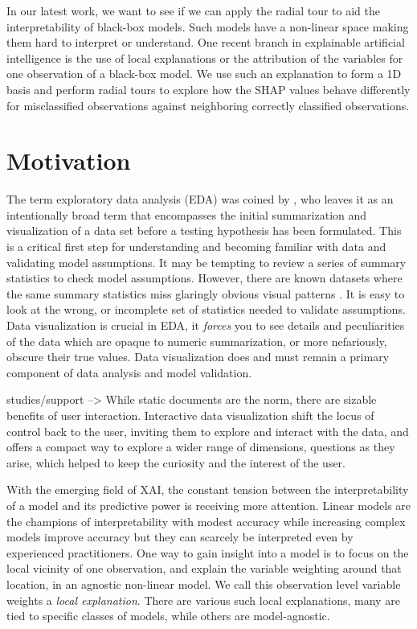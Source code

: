 \documentclass{template/monashthesis}
\begin{document}
In our latest work, we want to see if we can apply the radial tour to aid the interpretability of black-box models. Such models have a non-linear space making them hard to interpret or understand. One recent branch in explainable artificial intelligence \autocite[XAI,][\textcite{arrieta_explainable_2020}]{adadi_peeking_2018} is the use of local explanations or the attribution of the variables for one observation of a black-box model. We use such an explanation to form a 1D basis and perform radial tours to explore how the SHAP values behave differently for misclassified observations against neighboring correctly classified observations.

\hypertarget{motivation}{%
\section{Motivation}\label{motivation}}

The term exploratory data analysis (EDA) was coined by \textcite{tukey_exploratory_1977}, who leaves it as an intentionally broad term that encompasses the initial summarization and visualization of a data set before a testing hypothesis has been formulated. This is a critical first step for understanding and becoming familiar with data and validating model assumptions. It may be tempting to review a series of summary statistics to check model assumptions. However, there are known datasets where the same summary statistics miss glaringly obvious visual patterns \autocite{anscombe_graphs_1973,matejka_same_2017}. It is easy to look at the wrong, or incomplete set of statistics needed to validate assumptions. Data visualization is crucial in EDA, it \emph{forces} you to see details and peculiarities of the data which are opaque to numeric summarization, or more nefariously, obscure their true values. Data visualization does and must remain a primary component of data analysis and model validation.

studies/support --\textgreater{}
While static documents are the norm, there are sizable benefits of user interaction. Interactive data visualization shift the locus of control back to the user, inviting them to explore and interact with the data, and offers a compact way to explore a wider range of dimensions, questions as they arise, which helped to keep the curiosity and the interest of the user.

With the emerging field of XAI, the constant tension between the interpretability of a model and its predictive power is receiving more attention. Linear models are the champions of interpretability with modest accuracy while increasing complex models improve accuracy but they can scarcely be interpreted even by experienced practitioners. One way to gain insight into a model is to focus on the local vicinity of one observation, and explain the variable weighting around that location, in an agnostic non-linear model. We call this observation level variable weights a \emph{local explanation}. There are various such local explanations, many are tied to specific classes of models, while others are model-agnostic.
\end{document}

